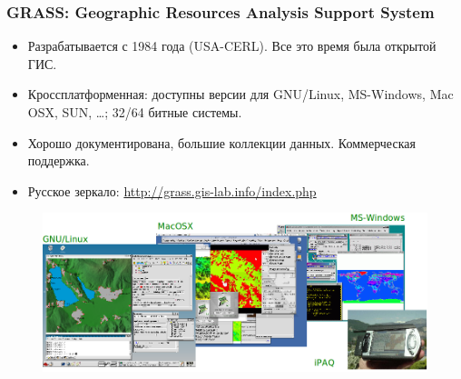
\begin{frame}
\frametitle{GRASS: Geographic Resources Analysis Support System}
\begin{itemize}
\item Разрабатывается с 1984 года (USA-CERL). Все это время была открытой ГИС.
\item Кроссплатформенная: доступны версии для GNU/Linux, MS-Windows, Mac OSX, SUN, \dots; 32/64 битные системы.
\item Хорошо документирована, большие коллекции данных. Коммерческая поддержка.
\item Русское зеркало: \href{http://grass.gis-lab.info/index.php}{http://grass.gis-lab.info/index.php}
\end{itemize}
\begin{figure}[!ht]
          \begin{center}
            \includegraphics[width=0.8\columnwidth]{./grass/img/platforms.png}
        \end{center}
\end{figure}
\end{frame}

